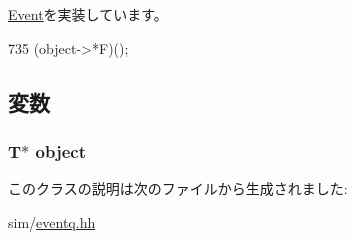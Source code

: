 \hyperlink{classEvent_a142b75b68a6291400e20fb0dd905b1c8}{Event}を実装しています。


\begin{DoxyCode}
735 { (object->*F)(); }
\end{DoxyCode}


\subsection{変数}
\hypertarget{classEventWrapper_acd5a12b9b1a75e37fd605accfe038a03}{
\subsubsection[{object}]{\setlength{\rightskip}{0pt plus 5cm}T$\ast$ {\bf object}}}
\label{classEventWrapper_acd5a12b9b1a75e37fd605accfe038a03}


このクラスの説明は次のファイルから生成されました:\begin{DoxyCompactItemize}
\item 
sim/\hyperlink{eventq_8hh}{eventq.hh}\end{DoxyCompactItemize}
